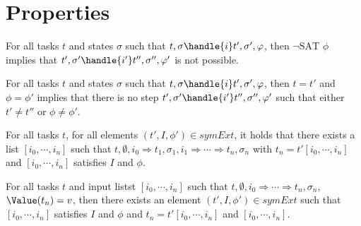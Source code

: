 


\section{Properties}
\label{sec:properties}


\begin{lemma}
For all tasks $t$ and states $\sigma$ such that $t,\sigma \handle{i} t',\sigma',\phi $,
then $\neg\text{SAT }\phi$ implies that $t',\sigma'\handle{i'} t'',\sigma'',\phi'$ is not possible.
\label{lemma:notSat}
\end{lemma}

\begin{lemma}
For all tasks $t$ and states $\sigma$ such that $t,\sigma \handle{i} t',\sigma',\phi$,
then $t=t'$ and $\phi=\phi'$ implies that there is no step $t',\sigma'\handle{i'} t'',\sigma'',\phi'$ such that either $t'\neq t''$ or $\phi\neq\phi'$.
\label{lemma:stuck}
\end{lemma}

\begin{theorem}
\label{thm:sound}

For all tasks $t$, for all elements $(t',I,\phi')\in symEx t$, it holds that there
exists a list $[i_0,\cdots,i_n]$ such that $t,\emptyset,i_0 \Rightarrow t_1,\sigma_1,i_1 \Rightarrow\cdots\Rightarrow t_n,\sigma_n$ with $t_n=t'[i_0,\cdots,i_n]$ and $[i_0,\cdots,i_n]$ satisfies $I$ and $\phi$.
\end{theorem}

\begin{theorem}

For all tasks $t$ and input listst $[i_0,\cdots,i_n]$ such that $t,\emptyset,i_0\Rightarrow\cdots\Rightarrow t_n,\sigma_n$, $\Value(t_n)=v$, then there exists an element $(t',I,\phi')\in symEx t$ such that $[i_0,\cdots,i_n]$ satisfies $I$ and $\phi$ and $t_n=t'[i_0,\cdots,i_n]$ and $[i_0,\cdots,i_n]$.

  \label{thm:complete}
\end{theorem}
